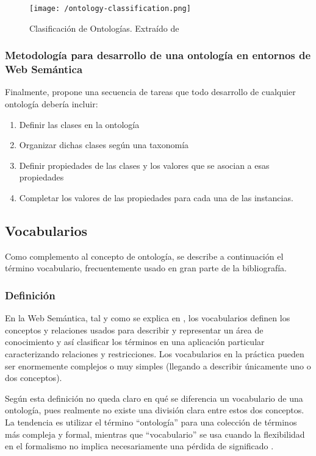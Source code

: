 \begin{figure}[!h]
  \begin{center}
    \texttt{[image: /ontology-classification.png]} 
    \caption{Clasificación de Ontologías. Extraído de \cite{guarino_formal_1998}}
    \label{fig:guarino-taxonto}
  \end{center}
\end{figure}

\subsubsection{Metodología para desarrollo de una ontología en entornos de Web Semántica}

Finalmente, \cite{noy_ontology_2001} propone una secuencia de tareas que todo
desarrollo de cualquier ontología debería incluir: 

\begin{enumerate}
\item Definir las clases en la ontología
\item Organizar dichas clases según una taxonomía
\item Definir propiedades de las clases y los valores que se asocian a esas
  propiedades
\item Completar los valores de las propiedades para cada una de las instancias. 
\end{enumerate}


\subsection{Vocabularios}

Como complemento al concepto de ontología, se describe a continuación el término
vocabulario, frecuentemente usado en gran parte de la bibliografía. 

\subsubsection{Definición}

En la Web Semántica, tal y como se explica en \cite{W3CSW}, los vocabularios definen los conceptos y relaciones usados
para describir y representar un área de conocimiento y así clasificar los
términos en una aplicación particular caracterizando relaciones y
restricciones. Los vocabularios en la práctica pueden ser enormemente complejos
o muy simples (llegando a describir únicamente uno o dos conceptos). 

Según esta definición no queda claro en qué se diferencia un vocabulario de una
ontología, pues realmente no existe una división clara entre estos dos
conceptos. La tendencia es utilizar el término ``ontología'' para una colección
de términos más compleja y formal, mientras que ``vocabulario'' se usa cuando la
flexibilidad en el formalismo no implica necesariamente una pérdida de
significado \cite{W3CSW}. 

